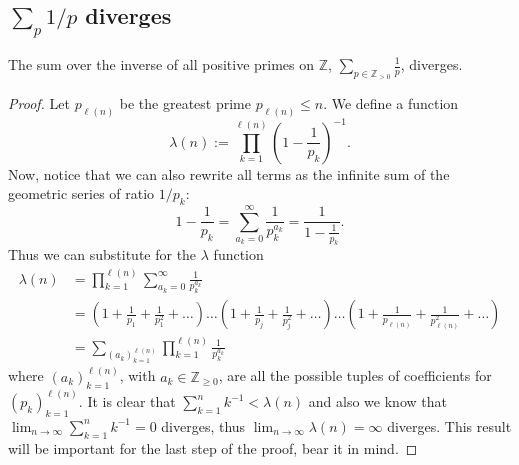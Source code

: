 \subsection{\texorpdfstring{\(\sum_p 1/p\)}{1/p} diverges}

\begin{theorem}
   The sum over the inverse of all positive primes on \(\mathbb{Z}\), \(\sum_{p
   \in \mathbb{Z}_{>0}}\frac{1}{p}\), diverges.
\end{theorem}

\begin{proof}
   Let \(p_{\ell(n)}\) be the greatest prime \(p_{\ell(n)} \leqslant n\). We
   define a function 
   \[
      \lambda(n) := \prod_{k = 1}^{\ell(n)} \left( 1 - \frac{1}{p_k}\right)^{-1}.
   \]
   Now, notice that we can also rewrite all terms as the infinite sum of the
   geometric series of ratio \(1/p_k\):
   \[
       1 - \frac{1}{p_k} = \sum_{a_k = 0}^{\infty}\frac{1}{p_k^{a_k}} =
       \frac{1}{1 - \frac{1}{p_k}}.
   \] 
   Thus we can substitute for the \(\lambda\) function
   \begin{align*}
       \lambda(n) 
       &= \prod_{k=1}^{\ell(n)} \sum_{a_k = 0}^\infty \frac{1}{p_k^{a_k}}
       \\
       &= \left( 1 + \frac{1}{p_1} + \frac{1}{p_1^2} + \dots \right)  \dots
       \left( 1 + \frac{1}{p_j} + \frac{1}{p_j^2} + \dots \right) \dots \left( 1
       + \frac{1}{p_{\ell(n)}} + \frac{1}{p_{\ell(n)}^2} + \dots \right) 
       \\
       &= \sum_{(a_k)_{k=1}^{\ell(n)}} \prod_{k = 1}^{\ell(n)} \frac{1}{p_k^{a_k}}
   \end{align*}
   where \(\left( a_k \right)_{k = 1}^{\ell(n)}\), with \(a_k \in
   \mathbb{Z}_{\geqslant 0}\), are all the possible tuples of coefficients for
   \(\left( p_k \right)_{k = 1}^{\ell(n)}\). It is clear that \(\sum_{k=1}^n
   k^{-1} < \lambda(n)\) and also we know that \(\lim_{n \to \infty}
   \sum_{k=1}^n k^{-1} = 0\) diverges, thus \(\lim_{n \to \infty}
   \lambda(n) = \infty\) diverges. This result will be important for the
   last step of the proof, bear it in mind. 


\end{proof}
